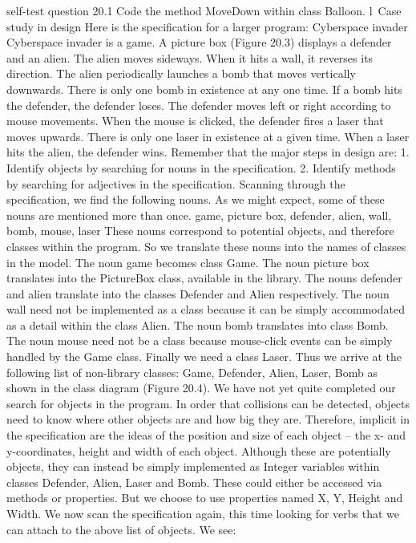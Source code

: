 self-test question
20.1	Code the method MoveDown within class Balloon.
l Case study in design
Here is the speciﬁcation for a larger program:
Cyberspace invader
Cyberspace invader is a game. A picture box (Figure 20.3) displays a defender and an alien. The alien moves sideways. When it hits a wall, it reverses its direction. The alien periodically launches a bomb that moves vertically downwards. There is only one bomb in existence at any one time. If a bomb hits the defender, the defender loses. The defender moves left or right according to mouse movements. When the mouse is clicked, the defender fires a laser that moves upwards. There is only one laser in existence at a given time. When a laser hits the alien, the defender wins.
Remember that the major steps in design are:
1.	Identify objects by searching for nouns in the speciﬁcation.
2.	Identify methods by searching for adjectives in the speciﬁcation.
Scanning through the speciﬁcation, we ﬁnd the following nouns. As we might expect, some of these nouns are mentioned more than once.
game, picture box, defender, alien, wall, bomb, mouse, laser
These nouns correspond to potential objects, and therefore classes within the program. So we translate these nouns into the names of classes in the model. The noun game becomes class Game. The noun picture box translates into the PictureBox class, available in the library. The nouns defender and alien translate into the classes Defender and Alien respectively. The noun wall need not be implemented as a class because it can be simply accommodated as a detail within the class Alien. The noun bomb translates into class Bomb. The noun mouse need not be a class because mouse-click events can be simply handled by the Game class. Finally we need a class Laser. Thus we arrive at the following list of non-library classes:
Game, Defender, Alien, Laser, Bomb
as shown in the class diagram (Figure 20.4).
We have not yet quite completed our search for objects in the program. In order that collisions can be detected, objects need to know where other objects are and how big they are. Therefore, implicit in the speciﬁcation are the ideas of the position and size of each object – the x- and y-coordinates, height and width of each object. Although these are potentially objects, they can instead be simply implemented as Integer variables within classes Defender, Alien, Laser and Bomb. These could either be accessed via methods or properties. But we choose to use properties named X, Y, Height and Width.
We now scan the speciﬁcation again, this time looking for verbs that we can attach to the above list of objects. We see:

